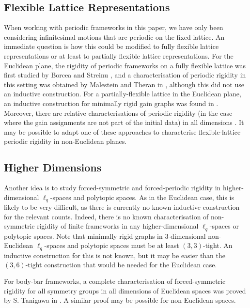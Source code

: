 \documentclass[reqno,a4paper,10pt]{article}
\theoremstyle{definition}
\theoremstyle{remark}
\numberwithin{equation}{section}
\numberwithin{figure}{section}
\numberwithin{table}{section}
\begin{document}
    \subsection{Flexible Lattice Representations}
    When working with periodic frameworks in this paper, we have only been considering infinitesimal motions that are periodic on the fixed lattice. An immediate question is how this could be modified to fully flexible lattice representations or at least to partially flexible lattice representations. For the Euclidean plane, the rigidity of periodic frameworks on a fully flexible lattice was first studied by Borcea and Streinu \cite{borstreiproc}, and a characterisation of periodic rigidity in this setting was obtained by Malestein and Theran in \cite[Theorem A]{MalesteinFlexible}, although this did not use an inductive construction. For a partially-flexible lattice in the Euclidean plane, an inductive construction for minimally rigid gain graphs was found in \cite[Theorem 2]{InductiveFlexible}. Moreover, there are relative characterisations of periodic rigidity (in the case where the gain assignments are not part of the initial data) in all dimensions \cite{BorceaStreinuMinimally,Quotient}.    
    It may be possible to adapt one of these approaches to characterise flexible-lattice periodic rigidity in non-Euclidean planes.

    \subsection{Higher Dimensions}
    Another idea is to study forced-symmetric and forced-periodic rigidity in higher-dimensional $\ell_q$-spaces and polytopic spaces. As in the Euclidean case, this is likely to be very difficult, as there is currently no known inductive construction for the relevant counts. Indeed, there is no known characterisation of non-symmetric rigidity of finite frameworks in any higher-dimensional $\ell_q$-spaces or polytopic spaces. Note that minimally rigid graphs in $3$-dimensional non-Euclidean $\ell_q$-spaces and polytopic spaces must be at least $(3,3)$-tight. An inductive construction for this is not known, but it may be easier than the $(3,6)$-tight construction that would be needed for the Euclidean case.
    
    For body-bar frameworks, a complete characterisation of forced-symmetric rigidity for all symmetry groups in all dimensions of Euclidean spaces was proved by S. Tanigawa in \cite[Theorem 7.2]{TanigawaBodyBar}. A similar proof may be possible for non-Euclidean spaces.
    
\end{document}
